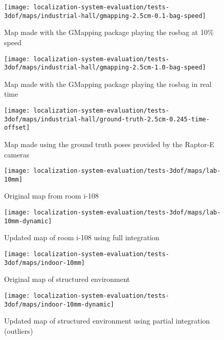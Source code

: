 \begin{figure}[H]
	\centering
	\texttt{[image: localization-system-evaluation/tests-3dof/maps/industrial-hall/gmapping-2.5cm-0.1-bag-speed]}
	\caption{Map made with the GMapping package playing the rosbag at 10\% speed}
	\label{fig:localization-system-evaluation_gmapping-2.5cm-0.1-bag-speed}
\end{figure}

\begin{figure}[H]
	\centering
	\texttt{[image: localization-system-evaluation/tests-3dof/maps/industrial-hall/gmapping-2.5cm-1.0-bag-speed]}
	\caption{Map made with the GMapping package playing the rosbag in real time}
	\label{fig:localization-system-evaluation_gmapping-2.5cm-1.0-bag-speed}
\end{figure}

\begin{figure}[H]
	\centering
	\texttt{[image: localization-system-evaluation/tests-3dof/maps/industrial-hall/ground-truth-2.5cm-0.245-time-offset]}
	\caption{Map made using the ground truth poses provided by the Raptor-E cameras}
	\label{fig:localization-system-evaluation_ground-truth-2.5cm-0.245-time-offset}
\end{figure}


\begin{figure}[H]
	\centering
	\texttt{[image: localization-system-evaluation/tests-3dof/maps/lab-10mm]}
	\caption{Original map from room i-108}
	\label{fig:localization-system-evaluation_lab-10mm}
\end{figure}

\begin{figure}[H]
	\centering
	\texttt{[image: localization-system-evaluation/tests-3dof/maps/lab-10mm-dynamic]}
	\caption{Updated map of room i-108 using full integration}
	\label{fig:localization-system-evaluation_lab-10mm-dynamic}
\end{figure}

\begin{figure}[H]
	\centering
	\texttt{[image: localization-system-evaluation/tests-3dof/maps/indoor-10mm]}
	\caption{Original map of structured environment}
	\label{fig:localization-system-evaluation_indoor-10mm}
\end{figure}

\begin{figure}[H]
	\centering
	\texttt{[image: localization-system-evaluation/tests-3dof/maps/indoor-10mm-dynamic]}
	\caption{Updated map of structured environment using partial integration (outliers)}
	\label{fig:localization-system-evaluation_indoor-10mm-dynamic}
\end{figure}



